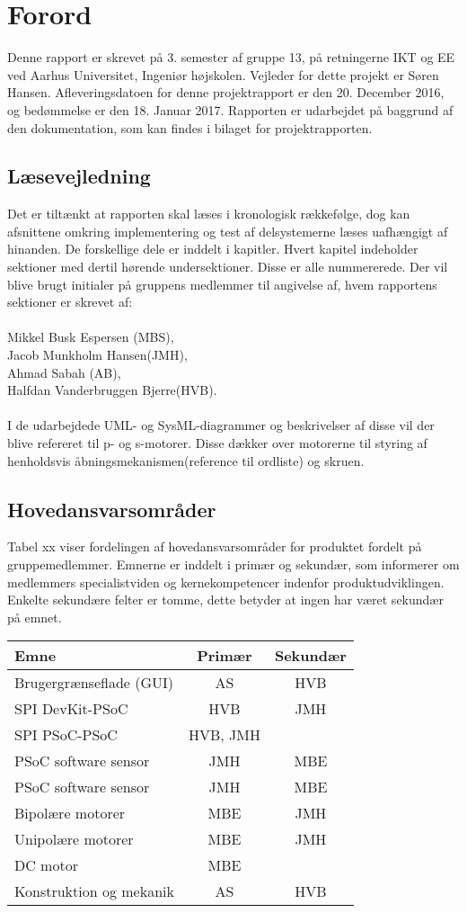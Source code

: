 \chapter{Forord}
Denne rapport er skrevet på 3. semester af gruppe 13, på retningerne IKT og EE ved Aarhus Universitet, Ingeniør højskolen. 
Vejleder for dette projekt er Søren Hansen. Afleveringsdatoen for denne projektrapport er den 20. December 2016, og bedømmelse er den 18. Januar 2017.
Rapporten er udarbejdet på baggrund af den dokumentation, som kan findes i bilaget for projektrapporten.

\section{Læsevejledning}
Det er tiltænkt at rapporten skal læses i kronologisk rækkefølge, dog kan afsnittene omkring implementering og test af delsystemerne læses
uafhængigt af hinanden. De forskellige dele er inddelt i kapitler. Hvert kapitel indeholder sektioner med dertil hørende undersektioner. Disse er alle nummererede.
Der vil blive brugt initialer på gruppens medlemmer til angivelse af, hvem rapportens sektioner er skrevet af: \\
\\
Mikkel Busk Espersen (MBS), \\
Jacob Munkholm Hansen(JMH), \\
Ahmad Sabah (AB), \\
Halfdan Vanderbruggen Bjerre(HVB). \\
\\
I de udarbejdede UML- og SysML-diagrammer og beskrivelser af disse vil der blive refereret til p- og s-motorer. Disse dækker over motorerne til styring af 
henholdsvis åbningsmekanismen(reference til ordliste) og skruen.

\section{Hovedansvarsområder}
Tabel xx viser fordelingen af hovedansvarsområder for produktet fordelt på gruppemedlemmer. Emnerne er inddelt i primær og sekundær, som informerer om 
medlemmers specialistviden og kernekompetencer indenfor produktudviklingen. Enkelte sekundære felter er tomme, dette betyder at ingen har været sekundær på 
emnet.\\

\begin{tabular}{| l | c | c |}
\hline
Emne & Primær & Sekundær\\\hline
Brugergrænseflade (GUI) & AS & HVB\\\hline
SPI DevKit-PSoC & HVB & JMH\\\hline
SPI PSoC-PSoC & HVB, JMH & \\\hline
PSoC software sensor & JMH & MBE\\\hline
PSoC software sensor & JMH & MBE\\\hline
Bipolære motorer & MBE & JMH\\\hline
Unipolære motorer & MBE & JMH\\\hline
DC motor & MBE & \\\hline
Konstruktion og mekanik & AS & HVB\\\hline
\end{tabular}